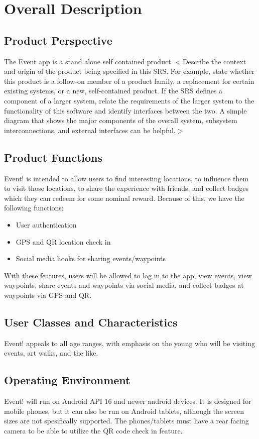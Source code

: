 \documentclass{scrreprt}
\begin{document}
\chapter{Overall Description}

\section{Product Perspective}
The Event app is a stand alone self contained product
$<$Describe the context and origin of the product being specified in this SRS.  
For example, state whether this product is a follow-on member of a product 
family, a replacement for certain existing systems, or a new, self-contained 
product. If the SRS defines a component of a larger system, relate the 
requirements of the larger system to the functionality of this software and 
identify interfaces between the two. A simple diagram that shows the major 
components of the overall system, subsystem interconnections, and external 
interfaces can be helpful.$>$

\section{Product Functions}
Event! is intended to allow users to find interesting locations, to influence them 
to visit those locations, to share the experience with friends, and collect badges 
which they can redeem for some nominal reward. Because of this, we have the 
following functions: 
\begin{itemize}
\item User authentication
\item GPS and QR location check in
\item Social media hooks for sharing events/waypoints
\end{itemize}
With these features, users will be allowed to log in to the app, view events, 
view waypoints, share events and waypoints via social media, and collect 
badges at waypoints via GPS and QR.

\section{User Classes and Characteristics}
Event! appeals to all age ranges, with emphasis on the young who will be visiting 
events, art walks, and the like.

\section{Operating Environment}
Event! will run on Android API 16 and newer android devices. It is designed for 
mobile phones, but it can also be run on Android tablets, although the screen 
sizes are not spesifically supported. The phones/tablets must have a rear facing 
camera to be able to utilize the QR code check in feature.
\end{document}
